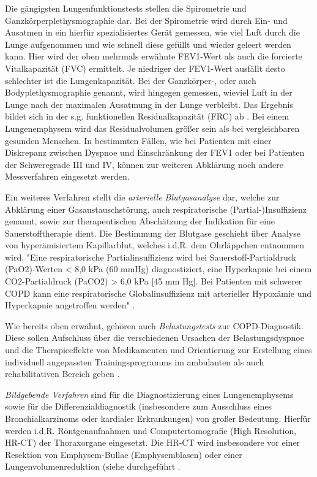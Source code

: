 Die gängigsten Lungenfunktionstests stellen die Spirometrie und Ganzkörperplethysmographie dar. Bei der Spirometrie wird durch Ein- und Ausatmen in ein hierfür spezialisiertes Gerät gemessen, wie viel Luft durch die Lunge aufgenommen und wie schnell diese gefüllt und wieder geleert werden kann. Hier wird der oben mehrmals erwähnte FEV1-Wert als auch die forcierte Vitalkapazität (FVC) ermittelt. Je niedriger der FEV1-Wert ausfällt desto schlechter ist die Lungenkapazität. Bei der Ganzkörper-, oder auch Bodyplethysmographie genannt, wird hingegen gemessen, wieviel Luft in der Lunge nach der maximalen Ausatmung in der Lunge verbleibt. Das Ergebnis bildet sich in der s.g. funktionellen Residualkapazität (FRC) ab \autocite[vgl.][e6f.]{vogelmeier2007}. Bei einem Lungenemphysem wird das Residualvolumen größer sein als bei vergleichbaren gesunden Menschen. In bestimmten Fällen, wie bei Patienten mit einer Diskrepanz zwischen Dyspnoe und Einschränkung der FEV1 oder bei Patienten der Schweregrade III und IV, können zur weiteren Abklärung noch andere Messverfahren eingesetzt werden.

Ein weiteres Verfahren stellt die \emph{arterielle Blutgasanalyse} dar, welche zur Abklärung einer Gasaustauschstörung, auch respiratorische (Partial-)Insuffizienz genannt, sowie zur therapeutischen Abschätzung der Indikation für eine Sauerstofftherapie dient. Die Bestimmung der Blutgase geschieht über Analyse von hyperämisiertem Kapillarblut, welches i.d.R. dem Ohrläppchen entnommen wird. "Eine respiratorische Partialinsuffizienz wird bei Sauerstoff-Partialdruck (PaO2)-Werten < 8,0 kPa (60 mmHg) diagnostiziert, eine Hyperkapnie bei einem CO2-Partialdruck (PaCO2) > 6,0 kPa [45 mm Hg]. Bei Patienten mit schwerer COPD kann eine respiratorische Globalinsuffizienz mit arterieller Hypoxämie und Hyperkapnie angetroffen werden" \autocite[190]{welte2007}.

Wie bereits oben erwähnt, gehören auch \emph{Belastungstests} zur COPD-Diagnostik. Diese sollen Aufschluss über die verschiedenen Ursachen der Belastungsdyspnoe und die Therapieeffekte von Medikamenten und Orientierung zur Erstellung eines individuell angepassten Trainingsprogramms im ambulanten als auch rehabilitativen Bereich geben \autocite[vgl.][e7]{vogelmeier2007}. 

\emph{Bildgebende Verfahren} sind für die Diagnostizierung eines Lungenemphysems sowie für die Differenzialdiagnostik (insbesondere zum Ausschluss eines Bronchialkarzinoms oder kardialer Erkrankungen) von großer Bedeutung. Hierfür werden i.d.R. Röntgenaufnahmen und Computertomografie (High Resolution, HR-CT) der Thoraxorgane eingesetzt. Die HR-CT wird insbesondere vor einer Resektion von Emphysem-Bullae (Emphysemblasen) oder einer Lungenvolumenreduktion (siehe \label{nicht-medikamentoese therapien} durchgeführt \autocite[191]{welte2007}.

